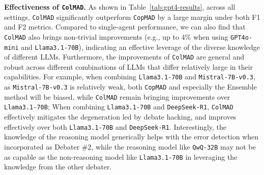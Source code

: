 \documentclass{article} %
\newcommand{\ours}[0]{\texttt{ColMAD}\xspace}
\newcommand{\copmad}[0]{\texttt{CopMAD}\xspace}
\begin{document}
\textbf{Effectiveness of \ours.} As shown in Table~\ref{tab:gpt4-results}, across all settings, \ours significantly outperform \copmad by a large margin under both F1 and F2 metrics. Compared to single-agent performance, we can also find that \ours also brings non-trivial improvements (e.g., up to 4\% when using \texttt{GPT4o-mini} and \texttt{Llama3.1-70B}), indicating an effective leverage of the diverse knowledge of different LLMs.
%
Furthermore, the improvements of \ours are general and robust across different combinations of LLMs that differ relatively large in their capabilities. For example, when combining  \texttt{Llama3.1-70B} and \texttt{Mistral-7B-v0.3}, as \texttt{Mistral-7B-v0.3} is relatively weak, both \copmad and especially the Ensemble method will be biased, while \ours remain bringing improvements over \texttt{Llama3.1-70B};
When combining \texttt{Llama3.1-70B} and \texttt{DeepSeek-R1}, \ours effectively mitigates the degeneration led by debate hacking, and improves effectively over both \texttt{Llama3.1-70B} and \texttt{DeepSeek-R1}.
Interestingly, the knowledge of the reasoning model generically helps with the error detection when incorporated as Debater \#2, while the reasoning model like \texttt{QwQ-32B} may not be as capable as the non-reasoning model like \texttt{Llama3.1-70B} in leveraging the knowledge from the other debater.



\end{document}
